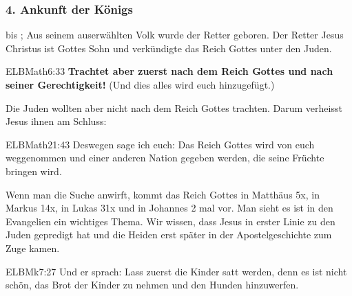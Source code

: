 \documentclass{../../inc/mybib}
\begin{document}
    \subsubsection{4. Ankunft der Königs}
     bis ; Aus seinem auserwählten Volk wurde der Retter geboren. Der Retter Jesus Christus ist Gottes Sohn und verkündigte das Reich Gottes unter den Juden.
    \begin{bibelbox}{ELB}{Math}{6:33}
        \textbf{Trachtet aber zuerst nach dem Reich Gottes und nach seiner Gerechtigkeit!} (Und dies alles wird euch hinzugefügt.)
    \end{bibelbox}
    Die Juden wollten aber nicht nach dem Reich Gottes trachten. Darum verheisst Jesus ihnen am Schluss:
    \begin{bibelbox}{ELB}{Math}{21:43}
        Deswegen sage ich euch: Das Reich Gottes wird von euch weggenommen und einer anderen Nation gegeben werden, die seine Früchte bringen wird.
    \end{bibelbox}
    Wenn man die Suche anwirft, kommt das Reich Gottes in Matthäus 5x, in Markus 14x, in Lukas 31x und in Johannes 2 mal vor. Man sieht es ist in den Evangelien ein wichtiges Thema. Wir wissen, dass Jesus in erster Linie zu den Juden gepredigt hat und die Heiden erst später in der Apostelgeschichte zum Zuge kamen.
    \begin{bibelbox}{ELB}{Mk}{7:27}
        Und er sprach: \flqq Lass zuerst die Kinder satt werden, denn es ist nicht schön, das Brot der Kinder zu nehmen und den Hunden hinzuwerfen.\frqq{}
    \end{bibelbox}
\end{document}
